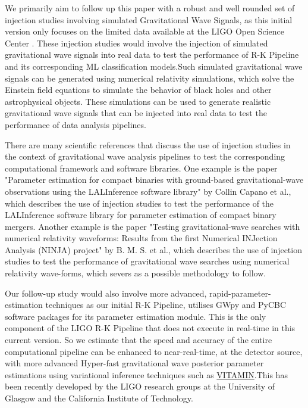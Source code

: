 We primarily aim to follow up this paper with a robust and well rounded set of injection studies involving simulated Gravitational Wave Signals, as this initial version only focuses on the limited data available at the LIGO Open Science Center \cite{00_LIGOOpenSciData}. These injection studies would involve the injection of simulated gravitational wave signals into real data to test the performance of R-K Pipeline and its corresponding ML classification models.Such simulated gravitational wave signals can be generated using numerical relativity simulations, which solve the Einstein field equations to simulate the behavior of black holes and other astrophysical objects. These simulations can be used to generate realistic gravitational wave signals that can be injected into real data to test the performance of data analysis pipelines.

There are many scientific references that discuss the use of injection studies in the context of gravitational wave analysis pipelines to test the corresponding computational framework and software libraries. One example is the paper "Parameter estimation for compact binaries with ground-based gravitational-wave observations using the LALInference software library" by Collin Capano et al.,\cite{26.0_2019parameterInjection} \cite{26.1_2021reliabilityParameterInjection} which describes the use of injection studies to test the performance of the LALInference software library for parameter estimation of compact binary mergers. Another example is the paper "Testing gravitational-wave searches with numerical relativity waveforms: Results from the first Numerical INJection Analysis (NINJA) project" by B. M. S. et al.\cite{26.2_2009testingInjection}, which describes the use of injection studies to test the performance of gravitational wave searches using numerical relativity wave-forms, which severs as a possible methodology to follow.

Our follow-up study would also involve more advanced, rapid-parameter-estimation techniques as our initial R-K Pipeline, utilises GWpy \cite{25.4_CBC2021gwpy} and PyCBC \cite{25.5_2019pycbcInference} software packages for its parameter estimation module. This is the only component of the LIGO R-K Pipeline that does not execute in real-time in this current version. So we estimate that the speed and accuracy of the entire computational pipeline can be enhanced to near-real-time, at the detector source, with more advanced Hyper-fast gravitational wave posterior parameter estimations using variational inference techniques such as \href{https://github.com/hagabbar/VItamin}{VITAMIN}.This has been recently developed by the LIGO research groups at the University of Glasgow and the California Institute of Technology. \cite{25.6_Glasgow2019VITAMIN}

